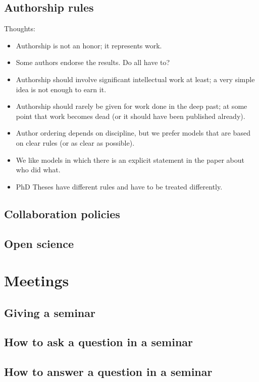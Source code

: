 \documentclass[letterpaper]{book}
\begin{document}
\chapter{Authorship rules}

Thoughts:
\begin{itemize}
    \item Authorship is not an honor; it represents work.
    \item Some authors endorse the results. Do all have to?
    \item Authorship should involve significant intellectual work at least; a very simple idea is not enough to earn it.
    \item Authorship should rarely be given for work done in the deep past; at some point that work becomes dead (or it should have been published already).
    \item Author ordering depends on discipline, but we prefer models that are based on clear rules (or as clear as possible).
    \item We like models in which there is an explicit statement in the paper about who did what.
    \item PhD Theses have different rules and have to be treated differently.
\end{itemize}

\chapter{Collaboration policies}

\chapter{Open science}

\part{Meetings}

\chapter{Giving a seminar}

\chapter{How to ask a question in a seminar}

\chapter{How to answer a question in a seminar}
\end{document}
